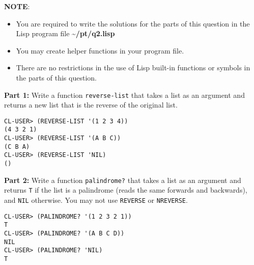\documentclass[11pt]{article}
\begin{document}
\textbf{NOTE}:
\begin{itemize}
\item You are required to write the solutions for the parts of this question in the Lisp program file \textbf{\textasciitilde{}/pt/q2.lisp}
\item You may create helper functions in your program file.
\item There are no restrictions in the use of Lisp built-in functions or symbols in the parts of this question.
\end{itemize}

\textbf{\textbf{Part 1:}} Write a function \texttt{reverse-list} that takes a list as an
argument and returns a new list that is the reverse of the original
list. 

\begin{verbatim}
CL-USER> (REVERSE-LIST '(1 2 3 4))
(4 3 2 1)
CL-USER> (REVERSE-LIST '(A B C))
(C B A)
CL-USER> (REVERSE-LIST 'NIL)
()
\end{verbatim}

\textbf{\textbf{Part 2:}} Write a function \texttt{palindrome?} that takes a list as an
argument and returns \texttt{T} if the list is a palindrome (reads the same
forwards and backwards), and \texttt{NIL} otherwise. You may not use
\texttt{REVERSE} or \texttt{NREVERSE}.

\begin{verbatim}
CL-USER> (PALINDROME? '(1 2 3 2 1))
T
CL-USER> (PALINDROME? '(A B C D))
NIL
CL-USER> (PALINDROME? 'NIL)
T
\end{verbatim}
\end{document}

